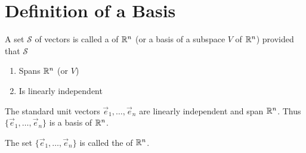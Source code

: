 \documentclass{ximera}
\begin{document}
\begin{example}
\begin{explanation}

\end{explanation}
\end{example}


\section*{Definition of a Basis}

\begin{definition}\label{def:basis}
A set $\mathcal{S}$ of vectors is called a  of $\mathbb{R}^n$ (or a basis of a subspace $V$ of $\mathbb{R}^n$) provided that $\mathcal{S}$
\begin{enumerate}
\item \label{item:defbasis1}
Spans $\mathbb{R}^n$ (or $V$)
\item \label{item:defbasis2}
Is linearly independent
\end{enumerate}
\end{definition}

\begin{example}
The standard unit vectors $\vec{e}_1, \ldots ,\vec{e}_n$ are linearly independent and span $\mathbb{R}^n$.  Thus $\{\vec{e}_1, \ldots ,\vec{e}_n\}$ is a basis of $\mathbb{R}^n$.
\end{example}

\begin{definition} The set $\{\vec{e}_1, \ldots ,\vec{e}_n\}$ is called the  of $\mathbb{R}^n$.
\end{definition}
\end{document}
